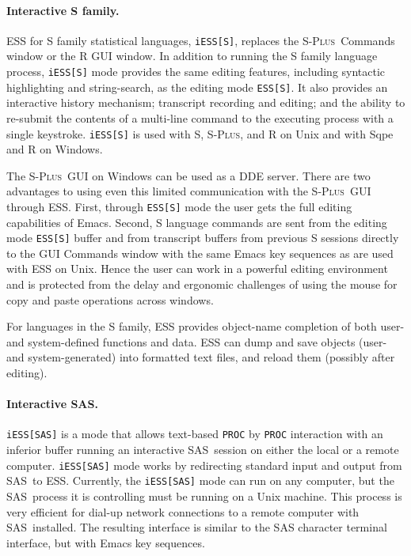 \documentclass{article}
\newcommand*{\SAS}{\textsc{SAS}}
\newcommand*{\Splus}{\textsc{S-Plus}}
\newcommand{\stexttt}[1]{{\small\texttt{#1}}}
\begin{document}
\paragraph{Interactive S family.}
ESS for S family statistical languages, \stexttt{iESS[S]}, replaces
the \Splus\ Commands window or the R GUI window.  In addition to
running the S family language process, \stexttt{iESS[S]} mode provides
the same editing features, including syntactic highlighting and
string-search, as the editing mode \stexttt{ESS[S]}.  It also provides
an interactive history mechanism; transcript recording and editing;
and the ability to re-submit the contents of a multi-line command to
the executing process with a single keystroke.  \stexttt{iESS[S]} is
used with S, \Splus, and R on Unix and with Sqpe and R on Windows.

The \Splus\ GUI on Windows can be used as a DDE server.  There are two
advantages to using even this limited communication with the \Splus\
GUI through ESS.  First, through \stexttt{ESS[S]} mode the user gets
the full editing capabilities of Emacs.  Second, S language commands
are sent from the editing mode \stexttt{ESS[S]} buffer and from
transcript buffers from previous S sessions directly to the GUI
Commands window with the same Emacs key sequences as are used with ESS
on Unix.  Hence the user can work in a powerful editing environment
and is protected from the delay and ergonomic challenges of using the
mouse for copy and paste operations across windows.

For languages in the S family, ESS provides object-name completion of
both user- and system-defined functions and data.  ESS can dump and
save objects (user- and system-generated) into formatted text files,
and reload them (possibly after editing).

\paragraph{Interactive \SAS.}
\stexttt{iESS[SAS]} is a mode that allows text-based \stexttt{PROC} by
\stexttt{PROC} interaction with an inferior buffer running an
interactive \SAS\ session on either the local or a remote computer.
\stexttt{iESS[SAS]} mode works by redirecting standard input and
output from \SAS\ to ESS.  Currently, the \stexttt{iESS[SAS]} mode can
run on any computer, but the \SAS\ process it is controlling must be
running on a Unix machine.  This process is very efficient for dial-up
network connections to a remote computer with \SAS\ installed.  The
resulting interface is similar to the SAS character terminal
interface, but with Emacs key sequences.
\end{document}
